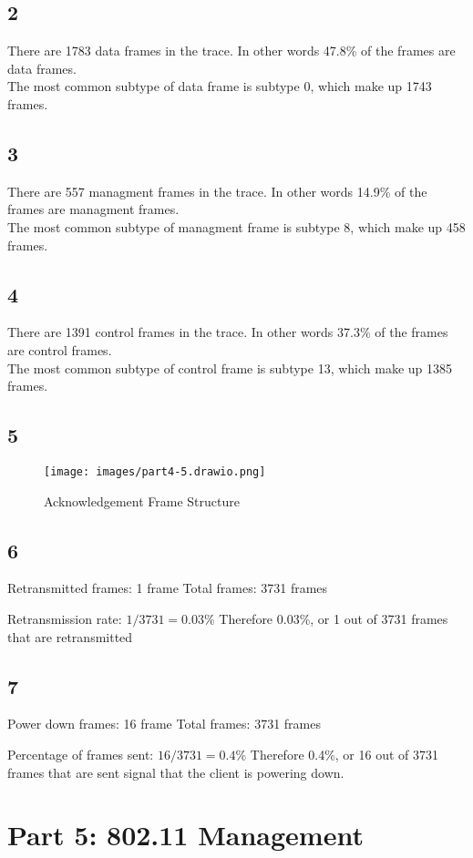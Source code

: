 \documentclass{article}
\begin{document}
    \subsection*{2}
    There are 1783 data frames in the trace. In other words 47.8\% of the frames are data frames.\\
    The most common subtype of data frame is subtype 0, which make up 1743 frames.
    \subsection*{3}
    There are 557 managment frames in the trace. In other words 14.9\% of the frames are managment frames.\\
    The most common subtype of managment frame is subtype 8, which make up 458 frames.
    \subsection*{4}
    There are 1391 control frames in the trace. In other words 37.3\% of the frames are control frames.\\
    The most common subtype of control frame is subtype 13, which make up 1385 frames.
    \subsection*{5}
    \begin{figure}[htbp]
        \centering
        \texttt{[image: images/part4-5.drawio.png]}
        \caption{Acknowledgement Frame Structure}
    \end{figure}
    \subsection*{6}
    Retransmitted frames: 1 frame
    Total frames: 3731 frames

    Retransmission rate: $1 / 3731 = 0.03\%$
    Therefore 0.03\%, or 1 out of 3731 frames that are retransmitted
    \subsection*{7}
    Power down frames: 16 frame
    Total frames: 3731 frames

    Percentage of frames sent: $16 / 3731 = 0.4\%$
    Therefore 0.4\%, or 16 out of 3731 frames that are sent signal that the client is powering down.
    \section*{Part 5: 802.11 Management}
\end{document}
